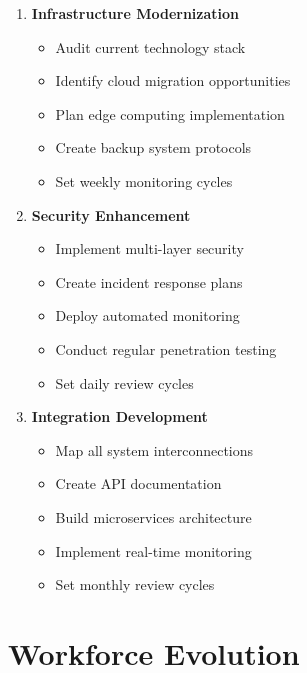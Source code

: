 \begin{tcolorbox}[colback=white,colframe=primarydark,title=\textbf{Technology Implementation Steps}]
    \begin{enumerate}
        \item \textbf{Infrastructure Modernization}
        \begin{itemize}
            \item Audit current technology stack
            \item Identify cloud migration opportunities
            \item Plan edge computing implementation
            \item Create backup system protocols
            \item Set weekly monitoring cycles
        \end{itemize}

        \item \textbf{Security Enhancement}
        \begin{itemize}
            \item Implement multi-layer security
            \item Create incident response plans
            \item Deploy automated monitoring
            \item Conduct regular penetration testing
            \item Set daily review cycles
        \end{itemize}

        \item \textbf{Integration Development}
        \begin{itemize}
            \item Map all system interconnections
            \item Create API documentation
            \item Build microservices architecture
            \item Implement real-time monitoring
            \item Set monthly review cycles
        \end{itemize}
    \end{enumerate}
\end{tcolorbox}


\section{Workforce Evolution}\label{sec:workforce-development}

